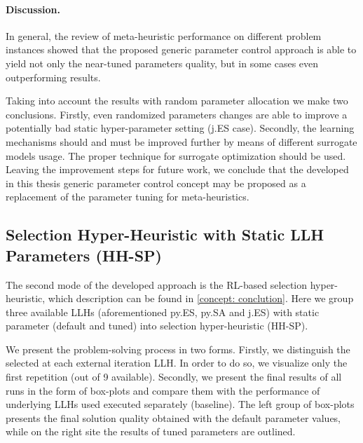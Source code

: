 \paragraph{Discussion.} In general, the review of meta-heuristic performance on different problem instances showed that the proposed generic parameter control approach is able to yield not only the near-tuned parameters quality, but in some cases even outperforming results.

Taking into account the results with random parameter allocation we make two conclusions. Firstly, even randomized parameters changes are able to improve a potentially bad static hyper-parameter setting (j.ES case). Secondly, the learning mechanisms should and must be improved further by means of different surrogate models usage. The proper technique for surrogate optimization should be used. Leaving the improvement steps for future work, we conclude that the developed in this thesis generic parameter control concept may be proposed as a replacement of the parameter tuning for meta-heuristics.


\subsection{Selection Hyper-Heuristic with Static LLH Parameters (HH-SP)}\label{eval:1:hh-sp}
The second mode of the developed approach is the RL-based selection hyper-heuristic, which description can be found in \cref{concept: conclution}. Here we group three available LLHs (aforementioned py.ES, py.SA and j.ES) with static parameter (default and tuned) into selection hyper-heuristic (HH-SP).

We present the problem-solving process in two forms. Firstly, we distinguish the selected at each external iteration LLH. In order to do so, we visualize only the first repetition (out of 9 available). Secondly, we present the final results of all runs in the form of box-plots and compare them with the performance of underlying LLHs used executed separately (baseline). The left group of box-plots presents the final solution quality obtained with the default parameter values, while on the right site the results of tuned parameters are outlined.

